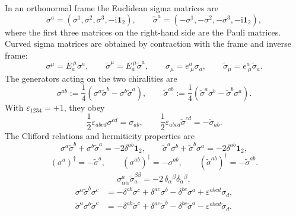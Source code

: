 \documentclass[11pt,a4paper]{article}
\numberwithin{equation}{section}
\theoremstyle{plain}
\theoremstyle{definition}
\theoremstyle{remark}
\newcommand{\ii}{\mathrm{i}}
\newcommand{\nn}{\nonumber}
\begin{document}
In an orthonormal frame the Euclidean sigma matrices are
\begin{equation}
\sigma^a=(\sigma^1,\sigma^2,\sigma^3,-\ii\mathbf{1}_2),
\qquad
\widetilde\sigma^a=(-\sigma^1,-\sigma^2,-\sigma^3,-\ii\mathbf{1}_2),
\label{eq:app-sigma-frame}
\end{equation}
where the first three matrices on the right-hand side are the Pauli matrices.  Curved sigma matrices are obtained by contraction with the frame and inverse frame:
\begin{equation}
\sigma^\mu=E_a^{\ \mu}\sigma^a,
\qquad
\widetilde\sigma^\mu=E_a^{\ \mu}\widetilde\sigma^a,
\qquad
\sigma_\mu=e^a_{\ \mu}\sigma_a,
\qquad
\widetilde\sigma_\mu=e^a_{\ \mu}\widetilde\sigma_a.
\label{eq:app-curved-sigma}
\end{equation}
The generators acting on the two chiralities are
\begin{equation}
\sigma^{ab}:=\frac14(\sigma^a\widetilde\sigma^b-\sigma^b\widetilde\sigma^a),
\qquad
\widetilde\sigma^{ab}:=\frac14(\widetilde\sigma^a\sigma^b-\widetilde\sigma^b\sigma^a).
\label{eq:sigmaab}
\end{equation}
With \(\varepsilon_{1234}=+1\), they obey
\begin{equation}
\frac12\varepsilon_{abcd}\sigma^{cd}=\sigma_{ab},
\qquad
\frac12\varepsilon_{abcd}\widetilde\sigma^{cd}=-\widetilde\sigma_{ab}.
\label{eq:app-sigma-duality}
\end{equation}
The Clifford relations and hermiticity properties are
\begin{equation}
\sigma^a\widetilde\sigma^b+\sigma^b\widetilde\sigma^a=-2\delta^{ab}\mathbf 1_2,
\qquad
\widetilde\sigma^a\sigma^b+\widetilde\sigma^b\sigma^a=-2\delta^{ab}\mathbf 1_2,
\label{eq:app-clifford}
\end{equation}
\begin{equation}
(\sigma^a)^\dagger=-\widetilde\sigma^a,
\qquad
(\sigma^{ab})^\dagger=-\sigma^{ab},
\qquad
(\widetilde\sigma^{ab})^\dagger=-\widetilde\sigma^{ab}.
\label{eq:app-sigma-hermiticity}
\end{equation}
\begin{equation}
\sigma^a_{\alpha\dot\alpha}\widetilde\sigma_{a}^{\dot\beta\beta}
=-2\,\delta_\alpha{}^{\beta}\delta_{\dot\alpha}{}^{\dot\beta},
\label{eq:app-sigma-completeness}
\end{equation}
\begin{align}
\sigma^a\widetilde\sigma^b\sigma^c
&=-\delta^{ab}\sigma^c+\delta^{ac}\sigma^b-\delta^{bc}\sigma^a
+\varepsilon^{abcd}\sigma_d,
\nn\\
\widetilde\sigma^a\sigma^b\widetilde\sigma^c
&=-\delta^{ab}\widetilde\sigma^c+\delta^{ac}\widetilde\sigma^b-\delta^{bc}\widetilde\sigma^a
-\varepsilon^{abcd}\widetilde\sigma_d.
\label{eq:app-triple-sigma}
\end{align}
\end{document}
